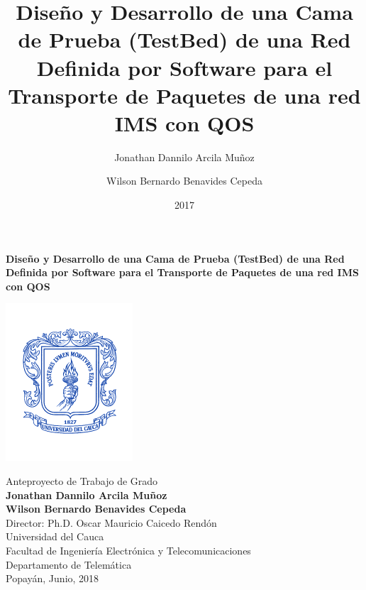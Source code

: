 \documentclass[11pt, letterpaper]{article}
\title{Diseño y Desarrollo de una Cama de Prueba (TestBed) de una Red Definida por Software para el Transporte de Paquetes de una red IMS con QOS}
\author{
    Jonathan Dannilo Arcila Muñoz
\and
	Wilson Bernardo Benavides Cepeda    
}
\date{2017}
\begin{document}


\begin{titlepage}
\thispagestyle{empty}
\centering

\LARGE{\textbf{Diseño y Desarrollo de una Cama de Prueba (TestBed) de una Red Definida por Software para el Transporte de Paquetes de una red IMS con QOS}}\\
\vspace{1.8cm}

\includegraphics[scale=1]{logo-unicauca.png}

\begin{center}
\Large
\vspace{8mm}
Anteproyecto de Trabajo de Grado\\
\vspace{1.2cm}
\textbf{Jonathan Dannilo Arcila Muñoz \\
Wilson Bernardo Benavides Cepeda}\\
\vspace{1.2cm}
Director: Ph.D. Oscar Mauricio Caicedo Rendón\\


\vfill
Universidad del Cauca\\
Facultad de Ingeniería Electrónica y Telecomunicaciones\\
Departamento de Telemática\\
Popayán, Junio, 2018

\end{center}

\end{titlepage}
\end{document}
